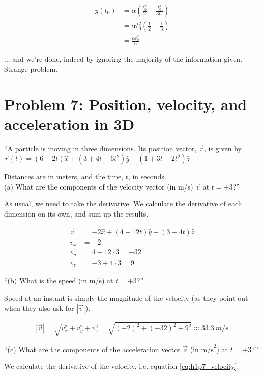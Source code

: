\documentclass[12pt,a4paper]{report}
\begin{document}
\begin{align}
y(t_0) &= \alpha\left( \frac{t_0^2}{2} - \frac{t_0^3}{3t_0} \right)\\
       &= \alpha t_0^2 \left( \frac{1}{2} - \frac{1}{3} \right)\\
       &= \frac{\alpha t_0^2}{6}
\end{align}

... and we're done, indeed by ignoring the majority of the information given. Strange problem.

\section{Problem 7: Position, velocity, and acceleration in 3D}

``A particle is moving in three dimensions. Its position vector, $\vec{r}$, is given by\\
$\vec{r}(t) = (6 - 2t)\hat{x} + (3 + 4t - 6t^2)\hat{y} - (1 + 3t - 2t^2)\hat{z}$

Distances are in meters, and the time, $t$, in seconds.\\
(a) What are the components of the velocity vector (in m/s) $\vec{v}$  at $t = +3$?''

As usual, we need to take the derivative. We calculate the derivative of each dimension on its own, and sum up the results.

\begin{align}
\vec{v} &= -2\hat{x} + (4 - 12t)\hat{y} - (3 - 4t)\hat{z} \label{eq:h1p7_velocity}\\
v_x &= -2\\
v_y &= 4 - 12 \cdot 3 = -32\\
v_z &= -3 + 4 \cdot 3 = 9
\end{align}

``(b) What is the speed (in m/s) at $t =+3$?''

Speed at an instant is simply the magnitude of the velocity (as they point out when they also ask for $|\vec{v}|$).

\begin{equation}
|\vec{v}| = \sqrt{v_x^2 + v_y^2 + v_z^2} = \sqrt{(-2)^2 + (-32)^2 + 9^2} \approx \SI{33.3}{m/s}
\end{equation}

``(c) What are the components of the acceleration vector $\vec{a}$ (in $\text{m/s}^2$) at $t = +3$?''

We calculate the derivative of the velocity, i.e. equation \eqref{eq:h1p7_velocity}.
\end{document}
